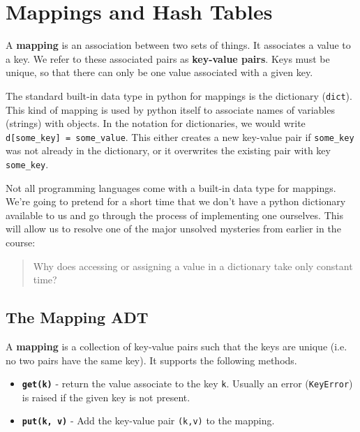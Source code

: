 \chapter{Mappings and Hash Tables}


A \textbf{mapping} is an association between two sets of things.  It associates a value to a key.  We  refer to these associated pairs as \textbf{key-value pairs}.
Keys must be unique, so that there can only be one value associated with a given key.


The standard built-in data type in python for mappings is the dictionary (\texttt{dict}).
This kind of mapping is used by python itself to associate names of variables (strings) with objects.
In the notation for dictionaries, we would write \texttt{d[some\_key] = some\_value}.
This either creates a new key-value pair if \texttt{some\_key} was not already in the dictionary, or it overwrites the existing pair with key \texttt{some\_key}.


Not all programming languages come with a built-in data type for mappings.
We're going to pretend for a short time that we don't have a python dictionary available to us and go through the process of implementing one ourselves.  This will allow us to resolve one of the major unsolved mysteries from earlier in the course:

\begin{quote}

Why does accessing or assigning a value in a dictionary take only constant time?

\end{quote}
\section{The Mapping ADT}


A \textbf{mapping} is a collection of key-value pairs such that the keys are unique (i.e. no two pairs have the same key).
It supports the following methods.

\begin{itemize}

\item 

\textbf{\texttt{get(k)}} - return the value associate to the key \texttt{k}.  Usually an error (\texttt{KeyError}) is raised if the given key is not present.



\item 

\textbf{\texttt{put(k, v)}} - Add the key-value pair \texttt{(k,v)} to the mapping.



\end{itemize}

